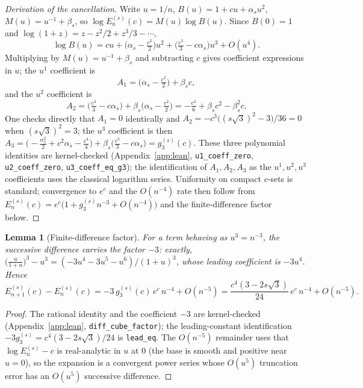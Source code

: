 \documentclass[11pt]{article}
\theoremstyle{plain}
\newtheorem{lemma}[theorem]{Lemma}
\theoremstyle{definition}
\theoremstyle{remark}
\begin{document}
\begin{proof}[Derivation of the cancellation]
Write $u=1/n$, $B(u) = 1 + cu + \alpha_s u^2$, $M(u) = u^{-1}+\beta_s$, so
$\log E_n^{(s)}(c) = M(u)\log B(u)$. Since $B(0)=1$ and
$\log(1+z) = z - z^2/2 + z^3/3 - \cdots$,
\[
  \log B(u) = cu + \bigl(\alpha_s - \tfrac{c^2}{2}\bigr)u^2
    + \bigl(\tfrac{c^3}{3} - c\alpha_s\bigr)u^3 + O(u^4).
\]
Multiplying by $M(u) = u^{-1}+\beta_s$ and subtracting $c$ gives coefficient
expressions in $u$; the $u^1$ coefficient is
\[
  A_1 = \bigl(\alpha_s - \tfrac{c^2}{2}\bigr) + \beta_s c,
\]
and the $u^2$ coefficient is
\[
  A_2 = \bigl(\tfrac{c^3}{3} - c\alpha_s\bigr) + \beta_s\bigl(\alpha_s - \tfrac{c^2}{2}\bigr)
      = -\tfrac{c^3}{6} + \beta_s c^2 - \beta_s^2 c .
\]
One checks directly that $A_1 = 0$ identically and
$A_2 = -c^3\bigl((s\sqrt3)^2-3\bigr)/36 = 0$ when $(s\sqrt3)^2=3$; the $u^3$
coefficient is then
$A_3 = \bigl(-\tfrac{\alpha_s^2}{2} + c^2\alpha_s - \tfrac{c^4}{4}\bigr)
+ \beta_s\bigl(\tfrac{c^3}{3} - c\alpha_s\bigr) = g_3^{(s)}(c)$.
These three polynomial identities are kernel-checked
(Appendix~\ref{app:lean}, \texttt{u1\_coeff\_zero}, \texttt{u2\_coeff\_zero},
\texttt{u3\_coeff\_eq\_g3}); the identification of $A_1,A_2,A_3$ as the
$u^1,u^2,u^3$ coefficients uses the classical logarithm series. Uniformity on
compact $c$-sets is standard; convergence to $e^c$ and the $O(n^{-4})$ rate then
follow from $E_n^{(s)}(c) = e^c\bigl(1 + g_3^{(s)} n^{-3} + O(n^{-4})\bigr)$ and
the finite-difference factor below.
\end{proof}

\begin{lemma}[Finite-difference factor]\label{lem:fd}
For a term behaving as $u^3 = n^{-3}$, the successive difference carries the
factor $-3$: exactly, $\bigl(\tfrac{u}{1+u}\bigr)^3 - u^3 =
(-3u^4-3u^5-u^6)/(1+u)^3$, whose leading coefficient is $-3u^4$. Hence
\[
  E_{n+1}^{(s)}(c) - E_n^{(s)}(c) = -3\,g_3^{(s)}(c)\,e^c\,n^{-4} + O(n^{-5})
    = \frac{c^4(3-2s\sqrt3)}{24}\,e^c\,n^{-4} + O(n^{-5}).
\]
\end{lemma}
\begin{proof}
The rational identity and the coefficient $-3$ are kernel-checked
(Appendix~\ref{app:lean}, \texttt{diff\_cube\_factor}); the leading-constant
identification $-3g_3^{(s)} = c^4(3-2s\sqrt3)/24$ is \texttt{lead\_eq}. The
$O(n^{-5})$ remainder uses that $\log E_n^{(s)} - c$ is real-analytic in $u$ at
$0$ (the base is smooth and positive near $u=0$), so the expansion is a
convergent power series whose $O(u^5)$ truncation error has an $O(u^5)$
successive difference.
\end{proof}
\end{document}
